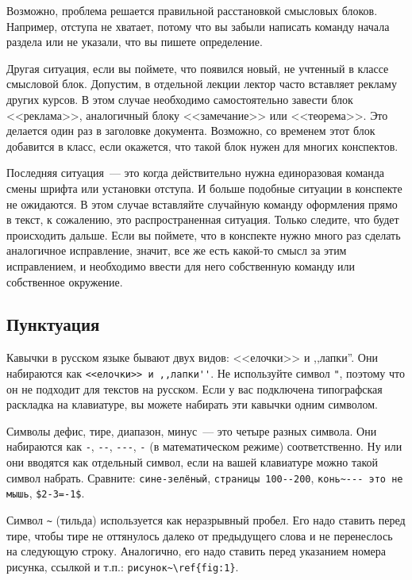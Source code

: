 \documentclass{article}
\begin{document}
    Возможно, проблема решается правильной расстановкой смысловых блоков. Например, отступа
    не хватает, потому что вы забыли написать команду начала раздела или не указали, что
    вы пишете определение.

    Другая ситуация, если вы поймете, что появился новый, не учтенный в классе смысловой блок.
    Допустим, в отдельной лекции лектор часто вставляет рекламу других курсов. В этом случае
    необходимо самостоятельно завести блок <<реклама>>, аналогичный блоку <<замечание>>
    или <<теорема>>. Это делается один раз в заголовке документа. Возможно, со временем
    этот блок добавится в класс, если окажется, что такой блок нужен для многих конспектов.

    Последняя ситуация~--- это когда действительно нужна единоразовая команда смены шрифта
    или установки отступа. И больше подобные ситуации в конспекте не ожидаются. В этом случае
    вставляйте случайную команду оформления прямо в текст, к сожалению, это
    распространенная ситуация. Только следите, что будет происходить дальше. Если вы поймете, что
    в конспекте нужно много раз сделать аналогичное исправление, значит, все же
    есть какой-то смысл за этим исправлением, и необходимо ввести для него
    собственную команду или собственное окружение.

    \subsection{Пунктуация}

    Кавычки в русском языке бывают двух видов: <<елочки>> и ,,лапки''. Они набираются как
    \verb|<<елочки>> и ,,лапки''|. Не используйте символ \verb|"|, поэтому что он не подходит
    для текстов на русском. Если у вас подключена типографская раскладка на клавиатуре,
    вы можете набирать эти кавычки одним символом.

    Символы дефис, тире, диапазон, минус~--- это четыре разных символа. Они набираются как
    \verb|-|, \verb|--|, \verb|---|, \verb|-| (в математическом режиме) соответственно.
    Ну или они вводятся как отдельный символ, если на вашей клавиатуре можно такой символ
    набрать. Сравните: \verb|сине-зелёный|, \verb|страницы 100--200|,
    \verb|конь~--- это не мышь|, \verb|$2-3=-1$|.

    Символ \verb|~| (тильда) используется как неразрывный пробел. Его надо ставить перед тире,
    чтобы тире не оттянулось далеко от предыдущего слова и не перенеслось на следующую строку.
    Аналогично, его надо ставить перед указанием номера рисунка, ссылкой и т.п.:
    \verb|рисунок~\ref{fig:1}|.
\end{document}
